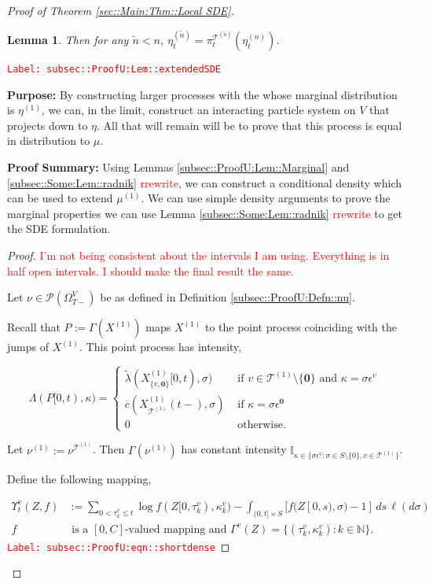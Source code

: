 \documentclass[12pt]{article}
\newcommand{\mb}{\mathbb}
\newcommand{\mc}{\mathcal}
\newcommand{\ov}{\overline}
\newcommand{\te}{\text}
\newcommand{\ep}{\epsilon}
\newcommand{\tr}{\textcolor{red}}
\newcommand{\labe}[1]{\tr{\texttt{Label: #1}}}
\newcommand{\purpose}{\textbf{Purpose: }}
\newcommand{\pfsum}{\textbf{Proof Summary: }}
\newcommand{\ind}{\hspace{24pt}}
\newcommand{\defeq}{:=}								%
\newcommand{\pmsr}{\mc{P}}							%
\renewcommand{\root}{\mathbf{0}}				%
\renewcommand{\v}{v}							%
\renewcommand{\S}{S}							%
\newcommand{\s}{\sigma}							%
\newcommand{\ev}{\ep}							%
\newcommand{\T}{T}								%
\renewcommand{\t}{t}							%
\newcommand{\sset}{\Omega}						%
\newcommand{\proj}{\pi}							%
\renewcommand{\tt}{s}							%
\newcommand{\X}{X}								%
\newcommand{\vind}[1]{^{#1}}					%
\newcommand{\vsi}[1]{^{#1}}						%
\newcommand{\cind}[1]{_{#1}}					%
\newcommand{\tp}[1]{(#1)}						%
\newcommand{\tip}[1]{#1}						%
\newcommand{\ts}[1]{_{#1}}						%
\newcommand{\const}{C}							%
\newcommand{\IGrg}{\ov{c}}						%
\newcommand{\tree}{\mc{T}}						%
\newcommand{\sln}[1]{^{(#1)}}					%
\newcommand{\Sm}{\ell}							%
\newcommand{\alt}[1]{\widetilde{#1}}			%
\newcommand{\indx}[1]{_{#1}}					%
\newcommand{\m}{\mu}							%
\newcommand{\mm}{\nu}							%
\newcommand{\mmm}{\eta}							%
\newcommand{\XXX}{Z}							%
\newcommand{\rt}{\tau}							%
\renewcommand{\it}{k}							%
\newcommand{\pmap}{\Gamma}						%
\renewcommand{\mark}{\kappa}					%
\newcommand{\rp}{P}								%
\newcommand{\ratee}{\Lambda}					%
\newcommand{\crate}{\alt{\lambda}}				%
\newcommand{\ds}{\Upsilon}						%
\newtheorem{lem}[thms]{Lemma}
\begin{document}
\begin{proof}[Proof of Theorem \ref{sec::Main:Thm::Local SDE}]
\begin{lem}
Then for any \(\alt{n} < n\), \(\mmm\sln{\alt{n}}\ts{\t} = \proj\vsi{\tree\sln{\alt{n}}}\ts{\t}(\mmm\sln{n}\ts{\t})\).
\label{subsec::ProofU:Lem::extendedSDE}
\end{lem}
\labe{subsec::ProofU:Lem::extendedSDE}

\purpose By constructing larger processes with the whose marginal distribution is \(\mmm\sln{1}\), we can, in the limit, construct an interacting particle system on \(V\) that projects down to \(\mmm\). All that will remain will be to prove that this process is equal in distribution to \(\m\).

\pfsum Using Lemmas \ref{subsec::ProofU:Lem::Marginal} and \ref{subsec::Some:Lem::radnik} \tr{rrewrite}, we can construct a conditional density which can be used to extend \(\mu\sln{1}\). We can use simple density arguments to prove the marginal properties we can use Lemma \ref{subsec::Some:Lem::radnik} \tr{rrewrite} to get the SDE formulation.

\begin{proof}
\tr{I'm not being consistent about the intervals I am using. Everything is in half open intervals. I should make the final result the same.}

Let \(\mm \in \pmsr(\sset\vsi{V}\ts{\T-})\) be as defined in Definition \ref{subsec::ProofU:Defn::nu}.

\ind Recall that \(\rp \defeq \pmap(\X\sln{1})\) maps \(\X\sln{1}\) to the point process coinciding with the jumps of \(\X\sln{1}\). This point process has intensity,

\[\ratee(\rp[0,\t),\mark) = \begin{cases}
\crate(\X\sln{1}\cind{\{\v,\root\}}\tip{[0,\t)},\s) &\te{ if } \v\in \tree\sln{1}\setminus\{\root\}\te{ and } \mark = \s\ev\vind{\v}\\
\IGrg{}(\X\sln{1}\cind{\tree\sln{1}}\tp{\t-},\s) &\te{ if } \mark = \s\ev\vind{\root}\\
0 &\te{ otherwise}.
\end{cases}\]

Let \(\mm\sln{1} \defeq \mm\vind{\tree\sln{1}}\). Then \(\pmap(\mm\sln{1})\) has constant intensity \(\mb{I}_{\kappa \in\{\s\ev\vind{\v}:\s\in\S\setminus\{0\},\v\in\tree\sln{1}\}}\). 

\ind Define the following mapping,

\begin{align}
\ds\vind{\v}\ts{\t}(\XXX,f) &\defeq \sum_{0 < \rt\indx{\it}\vind{\v} \leq \t} \log{f(\XXX\tip{[0,\rt\indx{\it}\vind{\v})},\mark\indx{\it}\vind{\v})} - \int_{(0,\t]\times \S} [f(\XXX\tip{[0,\tt)},\s) - 1]\,ds\,\Sm(d\s) \label{subsec::ProofU:eqn::shortdense}\\
f&\te{ is a }[0,\const] \te{-valued mapping and } \pmap\vind{\v}(\XXX) = \{(\rt\indx{\it}\vind{\v},\mark\indx{\it}\vind{\v}):\it\in\mb{N}\}.\nonumber
\end{align} 
\labe{subsec::ProofU:eqn::shortdense}


\end{proof}
\end{proof}
\end{document}
